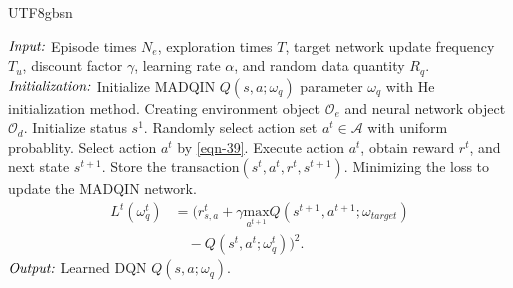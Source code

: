 \documentclass[lettersize,journal]{IEEEtran}
\begin{document}
\begin{CJK}{UTF8}{gbsn}
\renewcommand{\thefootnote}{\ding{\numexpr192+\value{footnote}}}
\begin{algorithm}[t]
    \renewcommand{\algorithmicrequire}{\textbf{Input:}}
    \renewcommand{\algorithmicensure}{\textbf{Output:}}
    \caption{MADQIN Algorithm}
    \label{DQN}
    \begin{algorithmic}[1]
        \State $\emph{Input:}$ Episode times $N_e$, exploration times $T$, target network update frequency $T_u$, discount factor $\gamma$, learning rate $\alpha$, and random data quantity $R_q$. %
      	  \State $\emph{Initialization:}$ Initialize MADQIN $Q(s,a;\omega _q)$ parameter $\omega _q$ with He initialization method.
        		\State Creating environment object $  \mathcal{O} _e$ and neural network object $  \mathcal{O} _d$.
        		\State Initialize status $s^1$.
		            \State Randomly select action set $a^t\in \mathcal{A}$ with uniform probablity. 
		        \Else
		            \State Select action $a^t$ by \eqref{eqn-39}.
		        \EndIf
		        \State Execute action $a^t$, obtain reward $r^t$, and next state $s^{t+1}$.
		        \State Store the transaction$(s^{t},a^{t},r^{t},s^{t+1})$.
		        \State Minimizing the loss to update the MADQIN network.
		        \State \begin{align} L^t(\omega _q^t)&= (r_{s,a}^t+\gamma \underset{a^{t+1}}{\text{max}}Q(s^{t+1},a^{t+1};\omega_{target})
		        					\nonumber\\&\quad-Q(s^t,a^t;\omega_q ^t) )^2. \nonumber\end{align}
	        \EndFor
        \EndFor
        \State $\emph{Output:}$ Learned DQN $Q(s,a;\omega _q)$. %
        
		\end{algorithmic}
\end{algorithm}


\end{CJK}
\end{document}
